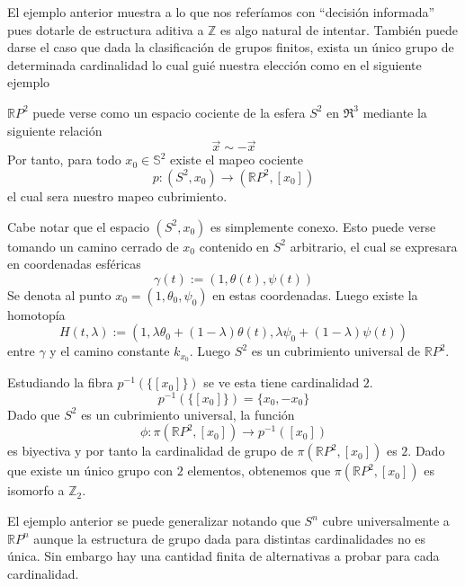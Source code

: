 El ejemplo anterior muestra a lo que nos referíamos con ``decisión
informada'' pues dotarle de estructura aditiva a \(\mathbb Z\) es algo
natural de intentar. También puede darse el caso que dada la
clasificación de grupos finitos, exista un único grupo de determinada
cardinalidad lo cual guié nuestra elección como en el siguiente ejemplo

\begin{ejemplo}
  \(\mathbb R P^2\) puede verse como un espacio cociente de la esfera
  \(S^2\)  en \(\Re^3\) mediante la siguiente relación
  \[ \vec x \sim - \vec x \]
  Por tanto, para todo \(x_0 \in \mathbb S^2\) existe el mapeo cociente
  \[ p : (S^2, x_0) \longrightarrow (\mathbb R P^2, [x_0]) \]
  el cual sera nuestro mapeo cubrimiento.

  Cabe notar que el espacio \((S^2, x_0)\) es simplemente conexo. Esto puede
  verse tomando un camino cerrado de \(x_0\) contenido en \(S^2\)
  arbitrario, el cual se expresara en coordenadas esféricas
  \[ \gamma (t) := (1 , \theta (t) , \psi(t) )\]
  Se denota al punto \(x_0 = (1, \theta_0, \psi_0)\) en estas
  coordenadas. Luego existe la homotopía
  \[ H (t, \lambda) := (1, \lambda \theta_0 + (1-\lambda) \theta(t),
    \lambda \psi_0 + (1-\lambda) \psi(t))\]
  entre \(\gamma\) y el camino constante \(k_{x_0}\). Luego \(S^2\) es
  un cubrimiento universal de \(\mathbb R P^2\).

  Estudiando la fibra \(p^{-1} (\{[x_0]\})\) se ve esta tiene
  cardinalidad \(2\).
  \[ p^{-1} (\{[x_0]\}) = \{ x_0 , - x_0 \} \]
  Dado que \(S^2\) es un cubrimiento universal, la función
  \[ \phi : \pi ( \mathbb R P^2 , [x_0]) \longrightarrow p^{-1}
    ([x_0])\]
  es biyectiva y por tanto la cardinalidad de grupo de \(\pi ( \mathbb R
  P^2, [x_0])\) es \(2\). Dado que existe un único grupo con \(2\)
  elementos, obtenemos que \(\pi ( \mathbb R P^2, [x_0])\) es isomorfo a
  \(\mathbb Z_2\).
\end{ejemplo}

El ejemplo anterior se puede generalizar notando que \(S^n\) cubre
universalmente a \(\mathbb R P^n\) aunque la estructura de grupo dada
para distintas cardinalidades no es única. Sin embargo hay una cantidad
finita de alternativas a probar para cada cardinalidad.

